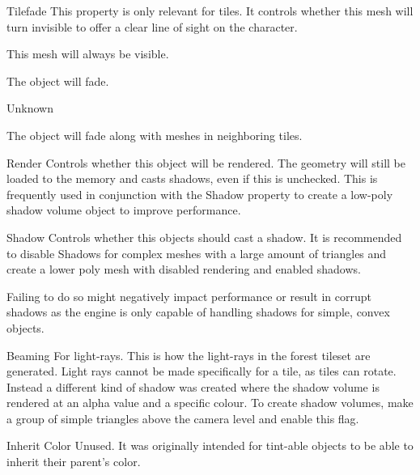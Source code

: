 \begin{propertyAurora}{Tilefade}
This property is only relevant for tiles. It controls whether this 
mesh will turn invisible to offer a clear line of sight on the character.
\begin{description}[leftmargin=6em,style=nextline]
    \item[None] This mesh will always be visible.
    \item[Fade] The object will fade.
    \item[Base] Unknown
    \item[Neighbor] The object will fade along with meshes in neighboring tiles.
\end{description}
\end{propertyAurora}

\begin{propertyAurora}{Render}
Controls whether this object will be rendered. The geometry will still be loaded to the memory and 
casts shadows, even if this is unchecked. This is frequently used in conjunction with the Shadow
property to create a low-poly shadow volume object to improve performance.
\end{propertyAurora}

\begin{propertyAurora}{Shadow}
Controls whether this objects should cast a shadow. It is recommended to 
disable Shadows for complex meshes with a large amount of triangles and create 
a lower poly mesh with disabled rendering and enabled shadows.

Failing to do so might negatively impact performance or result in corrupt shadows as 
the engine is only capable of handling shadows for simple, convex objects.
\end{propertyAurora}

\begin{propertyAurora}{Beaming}
For light-rays. This is how the light-rays in the forest tileset are generated. 
Light rays cannot be made specifically for a tile, as tiles can rotate.
Instead a different kind of shadow was created where the shadow
volume is rendered at an alpha value and a specific colour. To create shadow
volumes, make a group of simple triangles above the camera level and enable
this flag.
\end{propertyAurora}

\begin{propertyAurora}{Inherit Color}
Unused. It was originally intended for tint-able objects to be 
able to inherit their parent's color.
\end{propertyAurora}

